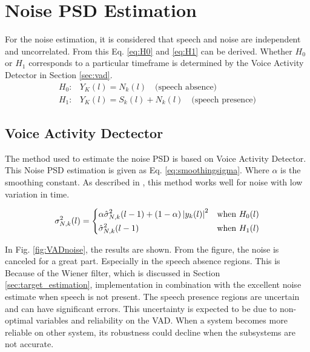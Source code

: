 \section{Noise PSD Estimation} \label{sec:noise_estimation}
For the noise estimation, it is considered that speech and noise are independent and uncorrelated. From this Eq. \ref{eq:H0} and \ref{eq:H1} can be derived. Whether $H_0$ or $H_1$ corresponds to a particular timeframe is determined by the Voice Activity Detector in Section \ref{sec:vad}.
\begin{align}
  H_{0}: & Y_{K}(l) = N_{k}(l) \quad \text{(speech absence)}
  \label{eq:H0} \\
  H_{1}: & Y_{K}(l) = S_{k}(l) + N_{k}(l) \quad \text{(speech presence)}
  \label{eq:H1}
\end{align}

\subsection{Voice Activity Dectector}
The method used to estimate the noise PSD is based on Voice Activity Detector. This Noise PSD estimation is given as Eq. \ref{eq:smoothingsigma}. Where $\alpha$ is the smoothing constant. As described in \cite{Hendriks}, this method works well for noise with low variation in time.

\begin{equation}
  \sigma_{N,k}^{2}(l)=
  \begin{dcases}
      \alpha \hat \sigma_{N,k}^{2}(l-1) + (1-\alpha)\abs{y_{k}(l)}^{2} & \text{when } H_{0}(l)\\
      \hat \sigma_{N,k}^{2}(l-1) & \text{when } H_{1}(l)
  \end{dcases}
  \label{eq:smoothingsigma}
\end{equation}

In Fig. \ref{fig:VADnoise}, the results are shown. From the figure, the noise is canceled for a great part. Especially in the speech absence regions. This is Because of the Wiener filter, which is discussed in Section \ref{sec:target_estimation}, implementation in combination with the excellent noise estimate when speech is not present. The speech presence regions are uncertain and can have significant errors. This uncertainty is expected to be due to non-optimal variables and reliability on the VAD. When a system becomes more reliable on other system, its robustness could decline when the subsystems are not accurate.

